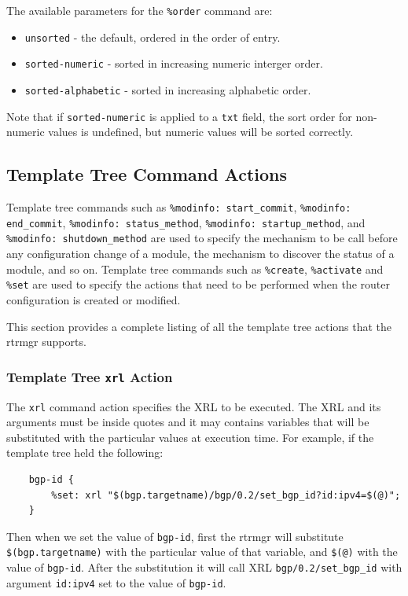 \documentclass[11pt]{article}
\begin{document}
\noindent The available parameters for the {\tt \%order} command are:
\begin{itemize}
\item {\tt unsorted} - the default, ordered in the order of entry.
\item {\tt sorted-numeric} - sorted in increasing numeric interger
  order.
\item {\tt sorted-alphabetic} - sorted in increasing alphabetic order.
\end{itemize}

\noindent Note that if {\tt sorted-numeric} is applied to a {\tt txt}
field, the sort order for non-numeric values is undefined, but numeric
values will be sorted correctly.

\newpage

\subsection{Template Tree Command Actions}

Template tree commands such as {\tt \%modinfo: start\_commit},
{\tt \%modinfo: end\_commit}, {\tt \%modinfo: status\_method},
{\tt \%modinfo: startup\_method}, and {\tt \%modinfo: shutdown\_method}
are used to specify the mechanism to be call before any configuration
change of a module, the mechanism to discover the status of a module, and so
on.
Template tree commands such as {\tt \%create}, {\tt \%activate} and
{\tt \%set} are used to specify the actions that need to be performed
when the router configuration is created or modified.

This section provides a complete listing of all the template tree
actions that the rtrmgr supports.

\subsubsection{Template Tree {\tt xrl} Action}

The {\tt xrl} command action specifies the XRL to be executed. The XRL
and its arguments must be inside quotes and it may contains variables
that will be substituted with the particular values at execution time.
For example, if the template tree held the following:

\begin{verbatim}
    bgp-id {
        %set: xrl "$(bgp.targetname)/bgp/0.2/set_bgp_id?id:ipv4=$(@)";
    }
\end{verbatim}

Then when we set the value of {\tt bgp-id}, first the rtrmgr will substitute
{\tt \$(bgp.targetname)} with the particular value of that variable, and
{\tt \$(@)} with the value of {\tt bgp-id}. After the substitution it will
call XRL {\tt bgp/0.2/set\_bgp\_id} with argument {\tt id:ipv4} set to the
value of {\tt bgp-id}.
\end{document}
